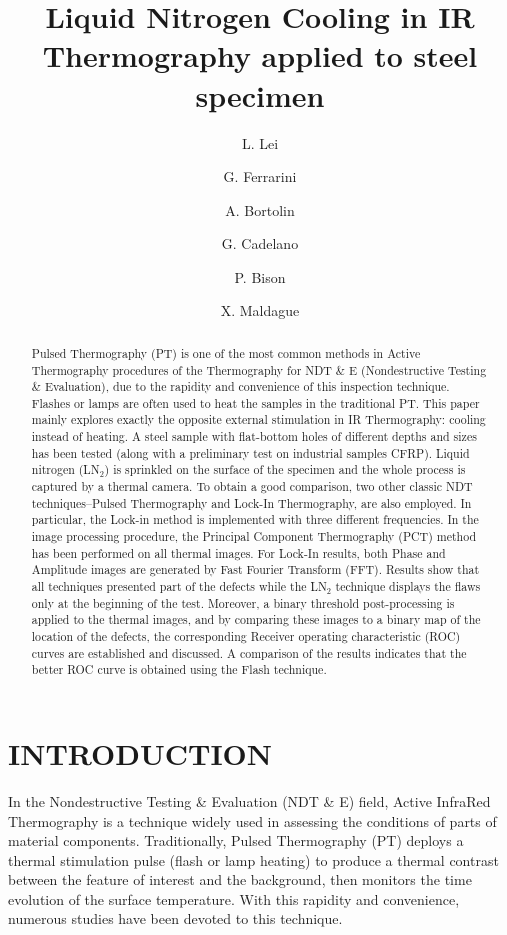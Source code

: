 \documentclass[]{spie}  %
\title{Liquid Nitrogen Cooling in IR Thermography applied to steel specimen}
\author[a]{L. Lei}
\author[b]{G. Ferrarini}
\author[b]{A. Bortolin}
\author[b]{G. Cadelano}
\author[b]{P. Bison}
\author[a]{X. Maldague}
\affil[a]{LVSN, University Laval, 1065 avenue de la Médecine, Québec (Québec) G1V 0A6 Canada}
\affil[b]{CNR-ITC, Corso Stati Uniti 4, 35127 Padova PD, Italy}
\begin{document}
 
\maketitle

\begin{abstract}
Pulsed Thermography (PT) is one of the most common methods in Active Thermography procedures of the Thermography for NDT \& E (Nondestructive Testing \& Evaluation), due to the rapidity and convenience of this inspection technique. Flashes or lamps are often used to heat the samples in the traditional PT. This paper mainly explores exactly the opposite external stimulation in IR Thermography: cooling instead of heating. A steel sample with flat-bottom holes of different depths and sizes has been tested (along with a preliminary test on industrial samples CFRP). Liquid nitrogen (LN$_2$) is sprinkled on the surface of the specimen and the whole process is captured by a thermal camera. To obtain a good comparison, two other classic NDT techniques--Pulsed Thermography and Lock-In Thermography, are also employed. In particular, the  Lock-in  method  is  implemented  with  three  different  frequencies.  In  the  image  processing  procedure,  the Principal Component Thermography (PCT) method has been performed on all thermal images. For Lock-In results, both Phase and Amplitude images are generated by Fast Fourier Transform (FFT). Results show that all techniques presented part of the defects while the LN$_2$ technique displays the flaws only at the beginning of the test. Moreover, a binary threshold post-processing is applied to the thermal images, and by comparing these images to a binary map of the location of the defects, the corresponding Receiver operating characteristic (ROC) curves are established and discussed. A comparison of the results indicates that the better ROC curve is obtained using the Flash technique.   
\end{abstract}


\section{INTRODUCTION}
\label{sec:introduction}  %
In the Nondestructive Testing \& Evaluation (NDT \& E) field, Active InfraRed Thermography is a technique widely used in assessing the conditions of parts of material components\cite{Maldague2001theory}. Traditionally, Pulsed Thermography (PT) deploys a thermal stimulation pulse (flash or lamp heating) to produce a thermal contrast between the feature of interest and the background, then monitors the time evolution of the surface temperature. With this rapidity and convenience, numerous studies have been devoted to this technique\cite{Maldague1993Nondestructive,Maldague1994bInfra,2011-ClementeIbarra-Castanedo,2007-Ibarra-Castanedo,duan2013quantitative}.
\end{document}
